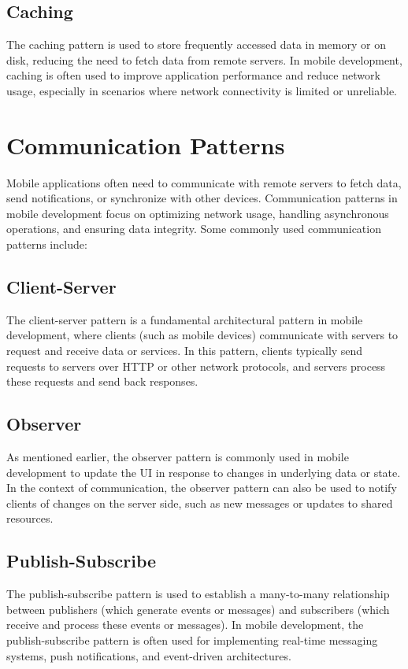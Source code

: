 \documentclass[journal]{IEEEtran}
\begin{document}
	\subsection{Caching}
	The caching pattern is used to store frequently accessed data in memory or on disk, reducing the need to fetch data from remote servers. In mobile development, caching is often used to improve application performance and reduce network usage, especially in scenarios where network connectivity is limited or unreliable.
	
	\section{Communication Patterns}
	Mobile applications often need to communicate with remote servers to fetch data, send notifications, or synchronize with other devices. Communication patterns in mobile development focus on optimizing network usage, handling asynchronous operations, and ensuring data integrity. Some commonly used communication patterns include:
	
	\subsection{Client-Server}
	The client-server pattern is a fundamental architectural pattern in mobile development, where clients (such as mobile devices) communicate with servers to request and receive data or services. In this pattern, clients typically send requests to servers over HTTP or other network protocols, and servers process these requests and send back responses.
	
	\subsection{Observer}
	As mentioned earlier, the observer pattern is commonly used in mobile development to update the UI in response to changes in underlying data or state. In the context of communication, the observer pattern can also be used to notify clients of changes on the server side, such as new messages or updates to shared resources.
	
	\subsection{Publish-Subscribe}
	The publish-subscribe pattern is used to establish a many-to-many relationship between publishers (which generate events or messages) and subscribers (which receive and process these events or messages). In mobile development, the publish-subscribe pattern is often used for implementing real-time messaging systems, push notifications, and event-driven architectures.
	
\end{document}
